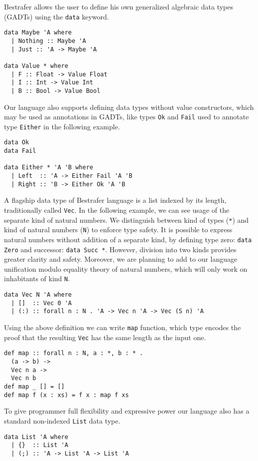 \documentclass[declaration,shortabstract,english]{iithesis}
\begin{document}
Bestrafer allows the user to define his own generalized algebraic data types (GADTs)
using the \verb+data+ keyword.
\begin{verbatim}
data Maybe 'A where
  | Nothing :: Maybe 'A
  | Just :: 'A -> Maybe 'A

data Value * where
  | F :: Float -> Value Float
  | I :: Int -> Value Int
  | B :: Bool -> Value Bool
\end{verbatim}
Our language also supports defining data types without value constructors, which may be used as annotations in GADTs,
like types \verb+Ok+ and \verb+Fail+ used to annotate type \verb+Either+ in the following example.
\begin{verbatim}
data Ok
data Fail

data Either * 'A 'B where
  | Left  :: 'A -> Either Fail 'A 'B
  | Right :: 'B -> Either Ok 'A 'B
\end{verbatim}
A flagship data type of Bestrafer language is a list indexed by its length, traditionally called \verb+Vec+.
In the following example, we can see usage of the separate kind of natural numbers. We distinguish between
kind of types (\verb+*+) and kind of natural numbers (\verb+N+) to enforce type safety. It is possible to express
natural numbers without addition of a separate kind, by defining type zero: \verb+data Zero+ and successor: \verb+data Succ *+.
However, division into two kinds provides greater clarity and safety. Moreover, we are planning to add to our language
unification modulo equality theory of natural numbers, which will only work on inhabitants of kind \verb+N+.
\begin{verbatim}
data Vec N 'A where
  | []  :: Vec 0 'A
  | (:) :: forall n : N . 'A -> Vec n 'A -> Vec (S n) 'A
\end{verbatim}
Using the above definition we can write \verb+map+ function, which type encodes the proof that the resulting \verb+Vec+ has the same
length as the input one.
\begin{verbatim}
def map :: forall n : N, a : *, b : * .
  (a -> b) ->
  Vec n a ->
  Vec n b
def map _ [] = []
def map f (x : xs) = f x : map f xs
\end{verbatim}
To give programmer full flexibility and expressive power our language also has a standard non-indexed \verb+List+ data type.
\begin{verbatim}
data List 'A where
  | {}  :: List 'A
  | (;) :: 'A -> List 'A -> List 'A
\end{verbatim}
\end{document}
